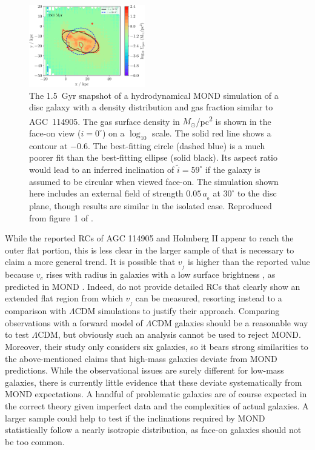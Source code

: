 \documentclass[fleqn,usenatbib,useAMS]{mnras} %
\begin{document}
\begin{figure}
	\centering
	\includegraphics[width=0.45\textwidth]{AGC_114905_EFE_1-5Gyr-0_6}
	\caption{The 1.5~Gyr snapshot of a hydrodynamical MOND simulation of a disc galaxy with a density distribution and gas fraction similar to AGC~114905. The gas surface density in $M_\odot$/pc\textsuperscript{2} is shown in the face-on view ($i = 0^\circ$) on a $\log_{10}$ scale. The solid red line shows a contour at $-0.6$. The best-fitting circle (dashed blue) is a much poorer fit than the best-fitting ellipse (solid black). Its aspect ratio would lead to an inferred inclination of $\widetilde{i} = 59^\circ$ if the galaxy is assumed to be circular when viewed face-on. The simulation shown here includes an external field of strength $0.05 \, a_{_0}$ at $30^\circ$ to the disc plane, though results are similar in the isolated case. Reproduced from figure~1 of \citet{Banik_2022_fake_inclination}.}
	\label{Fake_inclination_figure}
\end{figure}

While the reported RCs of AGC 114905 and Holmberg II appear to reach the outer flat portion, this is less clear in the larger sample of \citet{Mancera_2020} that is necessary to claim a more general trend. It is possible that $v_{_f}$ is higher than the reported value because $v_c$ rises with radius in galaxies with a low surface brightness \citep[see e.g. figure~15 of][]{Famaey_McGaugh_2012}, as predicted in MOND \citep[figure~1 of][]{Milgrom_1983_galaxies}. Indeed, \citet{Mancera_2020} do not provide detailed RCs that clearly show an extended flat region from which $v_{_f}$ can be measured, resorting instead to a comparison with $\Lambda$CDM simulations to justify their approach. Comparing observations with a forward model of $\Lambda$CDM galaxies should be a reasonable way to test $\Lambda$CDM, but obviously such an analysis cannot be used to reject MOND. Moreover, their study only considers six galaxies, so it bears strong similarities to the above-mentioned claims that high-mass galaxies deviate from MOND predictions. While the observational issues are surely different for low-mass galaxies, there is currently little evidence that these deviate systematically from MOND expectations. A handful of problematic galaxies are of course expected in the correct theory given imperfect data and the complexities of actual galaxies. A larger sample could help to test if the inclinations required by MOND statistically follow a nearly isotropic distribution, as face-on galaxies should not be too common.
\end{document}
